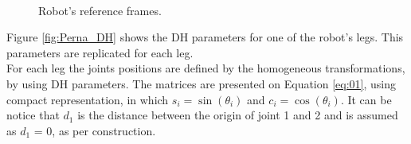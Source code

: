 \begin{figure}[h]
	\centering
	\\
\caption{Robot's reference frames.}
\end{figure}
Figure \ref{fig:Perna_DH} shows the DH parameters for one of the robot's legs. This parameters are replicated for each leg. \\
For each leg the joints positions are defined by the homogeneous transformations, by using DH parameters. The matrices are presented on Equation \ref{eq:01}, using compact representation, in which $s_i=\sin(\theta_i)$ and $c_i=\cos(\theta_i)$. It can be notice that $d_1$ is the distance between the origin of joint 1 and 2 and is assumed as $d_1$ = 0, as per construction.
